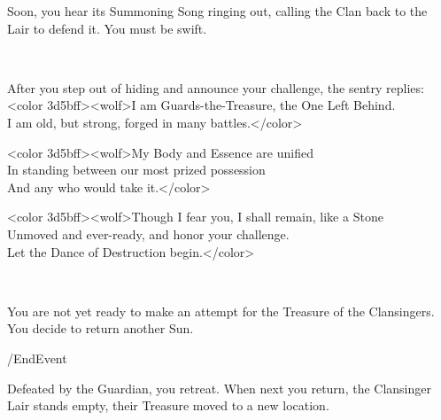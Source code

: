 Soon, you hear its Summoning Song ringing out, calling the Clan back to the Lair
to defend it. You must be swift.

\\ %

 


After you step out of hiding and announce your challenge, the sentry replies:\\
<color 3d5bff><wolf>I am Guards-the-Treasure, the One Left Behind.\\
I am old, but strong, forged in many battles.</color>

<color 3d5bff><wolf>My Body and Essence are unified\\
In standing between our most prized possession\\
And any who would take it.</color>

<color 3d5bff><wolf>Though I fear you, I shall remain, like a Stone\\
Unmoved and ever-ready, and honor your challenge.\\
Let the Dance of Destruction begin.</color>

\\ %

 
  


You are not yet ready to make an attempt for the Treasure of the Clansingers.
You decide to return another Sun.

\option /EndEvent 
  

Defeated by the Guardian, you retreat. When next you return, the Clansinger Lair
stands empty, their Treasure moved to a new location.

